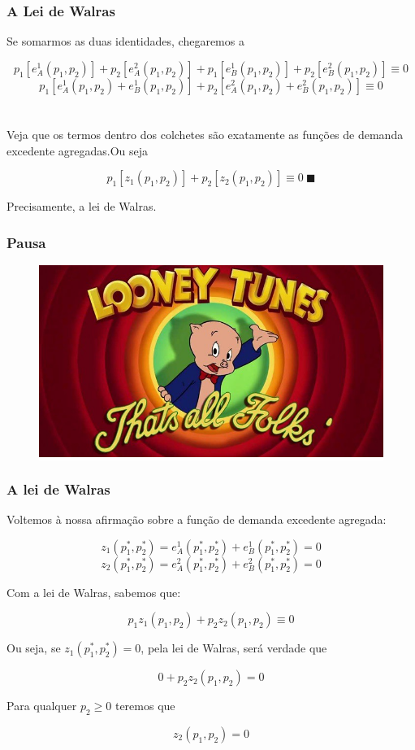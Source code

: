 \documentclass{beamer}[10]
\begin{document}
\begin{frame}
	\frametitle{A Lei de Walras}

	Se somarmos as duas identidades, chegaremos a

	$$p_1[e_A^1(p_1,p_2)] + p_2[e_A^2(p_1,p_2)] + 
	p_1[e_B^1(p_1,p_2)] + p_2[e_B^2(p_1,p_2)] \equiv 0$$
	$$p_1[e_A^1(p_1,p_2) + e_B^1(p_1,p_2)] + p_2[e_A^2(p_1,p_2) + e_B^2(p_1,p_2)] \equiv 0$$
	\\~\\
	Veja que os termos dentro dos colchetes são exatamente as funções de demanda excedente agregadas.Ou seja

	$$p_1[z_1(p_1,p_2)] + p_2[z_2(p_1,p_2) ] \equiv 0 \ \blacksquare$$

	Precisamente, a lei de Walras.

\end{frame}

\begin{frame}
	\frametitle{Pausa}

	\begin{figure}[H]
		\centering
		\colorbox{white}{\includegraphics[scale=0.425]{pausa.png}}
	\end{figure}		

\end{frame}

\begin{frame}
	\frametitle{A lei de Walras}

	Voltemos à nossa afirmação sobre a função de demanda excedente agregada:

	$$z_1(p_1^*,p_2^*) = e_A^1(p_1^*,p_2^*) + e_B^1(p_1^*,p_2^*) = 0$$
	$$z_2(p_1^*,p_2^*) = e_A^2(p_1^*,p_2^*) + e_B^2(p_1^*,p_2^*) = 0$$

	Com a lei de Walras, sabemos que:

	$$p_1 z_1(p_1,p_2) + p_2 z_2(p_1,p_2) \equiv 0$$

	Ou seja, se $z_1(p_1^*,p_2^*) = 0$, pela lei de Walras, será verdade que
	
	$$ 0 + p_2 z_2(p_1,p_2) = 0 $$

	Para qualquer $p_2 \geq 0$ teremos que

	$$z_2(p_1,p_2) = 0$$

\end{frame}
\end{document}

